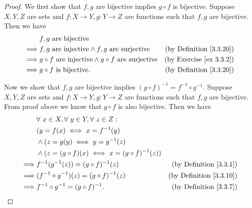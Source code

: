 \begin{proof}
    We first show that \(f, g\) are bijective implies \(g \circ f\) is bijective.
    Suppose \(X, Y, Z\) are sets and \(f : X \to Y, g : Y \to Z\) are functions such that \(f, g\) are bijective.
    Then we have
    \begin{align*}
                 & f, g \text{ are bijective}                                                                                   \\
        \implies & f, g \text{ are injective} \land f, g \text{ are surjective}           & \text{(by Definition \ref{3.3.20})} \\
        \implies & g \circ f \text{ are injective} \land g \circ f \text{ are surjective} & \text{(by Exercise \ref{ex 3.3.2})} \\
        \implies & g \circ f \text{ is bijective}.                                        & \text{(by Definition \ref{3.3.20})}
    \end{align*}

    Now we show that \(f, g\) are bijective implies \((g \circ f)^{-1} = f^{-1} \circ g^{-1}\).
    Suppose \(X, Y, Z\) are sets and \(f : X \to Y, g : Y \to Z\) are functions such that \(f, g\) are bijective.
    From proof above we know that \(g \circ f\) is also bijective.
    Then we have
    \begin{align*}
                 & \forall\ x \in X, \forall\ y \in Y, \forall\ z \in Z :                                        \\
                 & (y = f(x) \iff x = f^{-1}(y)                                                                  \\
                 & \land (z = g(y) \iff y = g^{-1}(z)                                                            \\
                 & \land (z = (g \circ f)(x) \iff x = (g \circ f)^{-1}(z))                                       \\
        \implies & f^{-1}(g^{-1}(z)) = (g \circ f)^{-1}(z)                 & \text{(by Definition \ref{3.3.1})}  \\
        \implies & (f^{-1} \circ g^{-1})(z) = (g \circ f)^{-1}(z)          & \text{(by Definition \ref{3.3.10})} \\
        \implies & f^{-1} \circ g^{-1} = (g \circ f)^{-1}.                 & \text{(by Definition \ref{3.3.7})}
    \end{align*}
\end{proof}

